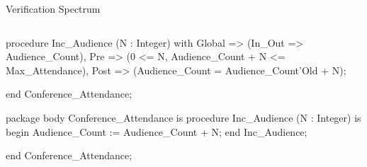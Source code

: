 \documentclass{beamer}
\begin{document}
\begin{frame}[fragile]{Verification Spectrum}
\begin{columns}
\begin{column}{9cm}
\begin{onlyenv}
\begin{pxcode}[language=SPARK,style=magic,gobble=8]
           procedure Inc_Audience (N : Integer)
           with Global => (In_Out => Audience_Count),
                Pre    => (0 <= N, Audience_Count + N <= Max_Attendance),
                Post   => (Audience_Count = Audience_Count'Old + N);

        end Conference_Attendance;

        package body Conference_Attendance
        is
           procedure Inc_Audience (N : Integer)
           is
           begin
              Audience_Count := Audience_Count + N;
           end Inc_Audience;

        end Conference_Attendance;
      \end{pxcode}
      \end{onlyenv}







    \end{column}
  \end{columns}

\end{frame}
\end{document}
